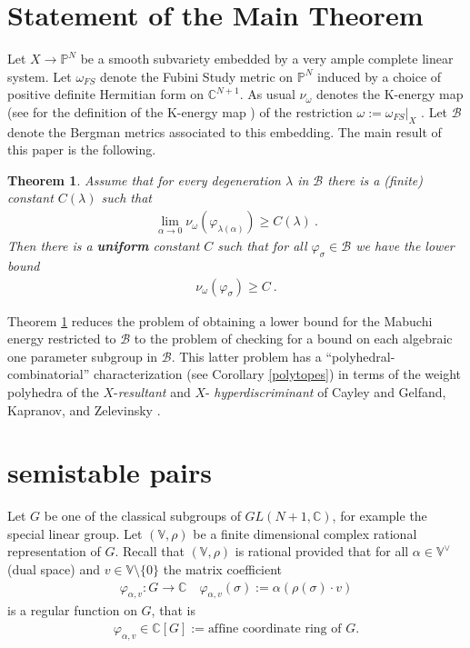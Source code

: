 \documentclass[12pt]{amsart}
\newtheorem{theorem}{Theorem}
\numberwithin{equation}{section}
\numberwithin{remark}{section}
\numberwithin{theorem}{section}
\numberwithin{proposition}{section}
\numberwithin{definition}{section}
\numberwithin{lemma}{section}
\numberwithin{claim}{section}
\numberwithin{corollary}{section}
\numberwithin{conjecture}{section}
\begin{document}
 \section{Statement of the Main Theorem  }
 Let $X{\ensuremath{\longrightarrow}} {\ensuremath{\mathbb{P}^{N}}}$ be a smooth subvariety embedded by a very ample complete linear system. Let ${\ensuremath{\omega}}_{FS}$ denote the Fubini Study metric on ${\ensuremath{\mathbb{P}^{N}}}$ induced by a choice of positive definite Hermitian form on ${\ensuremath{\mathbb{C}^{N+1}}}$.  As usual $\nu_{\ensuremath{\omega}}$ denotes the K-energy map (see \cite{mabuchi} for the definition of the K-energy map )  of the restriction  ${\ensuremath{\omega}}:={{\ensuremath{\omega}}_{FS}}|_X$ . Let $\mathcal{B}$ denote the Bergman metrics associated to this embedding. The main result of this paper is the following.
 \begin{theorem}\label{mainthm}
 Assume that for every degeneration $\lambda$ in $\mathcal{B}$ there is a (finite) constant $C(\lambda)$ such that
 \begin{align*}
 \lim_{\alpha{\ensuremath{\longrightarrow}} 0}\nu_{\ensuremath{\omega}}(\varphi_{\lambda(\alpha)})\geq  C(\lambda) \ .
 \end{align*}
 Then there is a \textbf{uniform} constant $C$ such that for all ${\ensuremath{\varphi_{\sigma}}}\in \mathcal{B}$ we have the lower bound
 \begin{align*}
 \nu_{\ensuremath{\omega}}({\ensuremath{\varphi_{\sigma}}})\geq C   \ .
 \end{align*}
 \end{theorem}
 Theorem \ref{mainthm} reduces the problem of obtaining a lower bound for the Mabuchi energy restricted to $\mathcal{B}$ to the problem of checking for a bound on each algebraic one parameter subgroup in $\mathcal{B}$. This latter problem has a ``polyhedral-combinatorial'' characterization (see Corollary \ref{polytopes}) in terms of  the weight polyhedra of the $X$-\emph{resultant} and $X$- \emph{hyperdiscriminant} of Cayley and Gelfand, Kapranov, and Zelevinsky \cite{gkz}.

 
\section{semistable pairs}
Let $G$ be one of the classical subgroups of $GL(N+1,\mathbb{C})$, for example the special linear group.
 Let $(\mathbb{V},\rho)$ be a finite dimensional complex rational representation of $G$. Recall that $(\mathbb{V},\rho)$ is  {rational} provided that for all $\alpha\in \mathbb{V}^{\vee}$ (dual space) and $v\in \mathbb{V}\setminus \{0\}$ the  {matrix coefficient}
\begin{align}
\varphi_{\alpha , v}:G{\ensuremath{\longrightarrow}} \mathbb{C} \quad \varphi_{\alpha , v}(\sigma):=\alpha(\rho(\sigma)\cdot v) 
\end{align}
is a {regular function} on $G$, that is
\begin{align}
\varphi_{\alpha , v}\in \mathbb{C}[G]:= \mbox{affine coordinate ring of $G$} .
\end{align}
\end{document}
